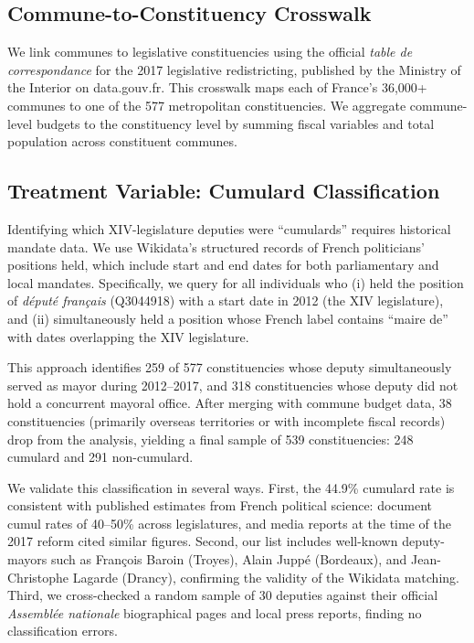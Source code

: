 \documentclass[12pt]{article}
\begin{document}
\subsection{Commune-to-Constituency Crosswalk}

We link communes to legislative constituencies using the official \textit{table de correspondance} for the 2017 legislative redistricting, published by the Ministry of the Interior on data.gouv.fr. This crosswalk maps each of France's 36,000+ communes to one of the 577 metropolitan constituencies. We aggregate commune-level budgets to the constituency level by summing fiscal variables and total population across constituent communes.

\subsection{Treatment Variable: Cumulard Classification}

Identifying which XIV-legislature deputies were ``cumulards'' requires historical mandate data. We use Wikidata's structured records of French politicians' positions held, which include start and end dates for both parliamentary and local mandates. Specifically, we query for all individuals who (i) held the position of \textit{député français} (Q3044918) with a start date in 2012 (the XIV legislature), and (ii) simultaneously held a position whose French label contains ``maire de'' with dates overlapping the XIV legislature.

This approach identifies 259 of 577 constituencies whose deputy simultaneously served as mayor during 2012--2017, and 318 constituencies whose deputy did not hold a concurrent mayoral office. After merging with commune budget data, 38 constituencies (primarily overseas territories or with incomplete fiscal records) drop from the analysis, yielding a final sample of 539 constituencies: 248 cumulard and 291 non-cumulard.

We validate this classification in several ways. First, the 44.9\% cumulard rate is consistent with published estimates from French political science: \citet{francois2006cumul} document cumul rates of 40--50\% across legislatures, and media reports at the time of the 2017 reform cited similar figures. Second, our list includes well-known deputy-mayors such as François Baroin (Troyes), Alain Juppé (Bordeaux), and Jean-Christophe Lagarde (Drancy), confirming the validity of the Wikidata matching. Third, we cross-checked a random sample of 30 deputies against their official \textit{Assemblée nationale} biographical pages and local press reports, finding no classification errors.
\end{document}
